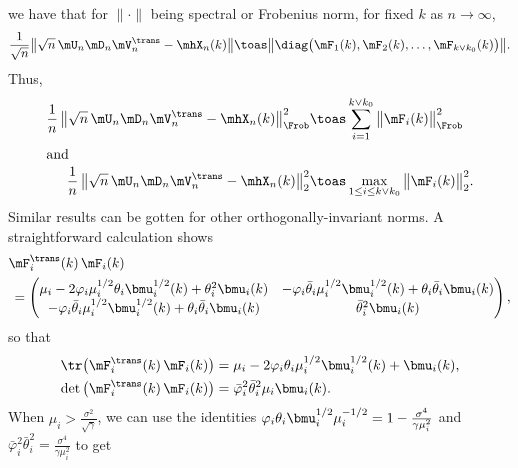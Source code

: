 we have that for $\| \cdot \|$ being spectral or Frobenius norm, for
fixed $k$ as $n\to \infty$,
\[
    \frac{1}{\sqrt{n}}
    \big\| \sqrt{n} \, \mU_n \mD_n \mV_n^\trans - \mhX_n(k) \big\|
        \toas
        \big\|
            \diag \big(
                \mF_1(k),
                \mF_2(k),
                \ldots,
                \mF_{k \vee k_0}(k)
            \big) \big\|.
\]
Thus,
\begin{align}
    \frac{1}{n} \,
    \big\| \sqrt{n} \, \mU_n \mD_n \mV_n^\trans - \mhX_n(k) \big\|_\Frob^2
        &\toas
            \sum_{i=1}^{k \vee k_0}
                \big\| \mF_i(k) \big\|_\Frob^2 \\
\intertext{and} \label{E:spec2-loss-limit}
    \frac{1}{n} \,
    \big\| \sqrt{n} \, \mU_n \mD_n \mV_n^\trans - \mhX_n(k) \big\|_2^2
        &\toas
            \max_{1 \leq i \leq k \vee k_0}
                \big\| \mF_i(k) \big\|_2^2. 
\end{align}
Similar results can be gotten for other orthogonally-invariant norms.
A straightforward calculation shows
\[
    \begin{split}
    &\mF_i^\trans(k) \, \mF_i(k) \\
        &\,=
        \left(
        \begin{matrix}
            \mu_i 
            - 2 \varphi_i \mu_i^{1/2} \theta_i \bmu_i^{1/2}(k) 
            + \theta_i^2 \bmu_i(k) &
                - \varphi_i \bar \theta_i \mu_i^{1/2} \bmu_i^{1/2}(k)
                + \theta_i \bar \theta_i \bmu_i(k) \\
            - \varphi_i \bar \theta_i \mu_i^{1/2} \bmu_i^{1/2}(k)
            + \theta_i \bar \theta_i \bmu_i(k) &
                \bar \theta_i^2 \bmu_i(k)
        \end{matrix}
        \right),
    \end{split}
\]
so that
\begin{align*}
    \tr \big( \mF_i^\trans(k) \, \mF_i(k) \big)
        &= \mu_i 
           - 2 \varphi_i \theta_i \mu_i^{1/2} \bmu_i^{1/2} (k) 
           + \bmu_i(k), \\
    \det \big( \mF_i^\trans(k) \, \mF_i(k) \big)
        &= \bar \varphi_i^2 \bar \theta_i^2 \mu_i \bmu_i(k).
\end{align*}
When $\mu_i > \frac{\sigma^2}{\sqrt{\gamma}}$, we can use the identities
\(
    \varphi_i \theta_i \bmu_i^{1/2} \mu_i^{-1/2}
    =
    1
    -
    \frac{\sigma^4}{\gamma \mu_i^2}
\)
and
\(
    \bar \varphi_i^2 \bar \theta_i^2
    =
    \frac{\sigma^4}{\gamma \mu_i^2}
\)
to get
